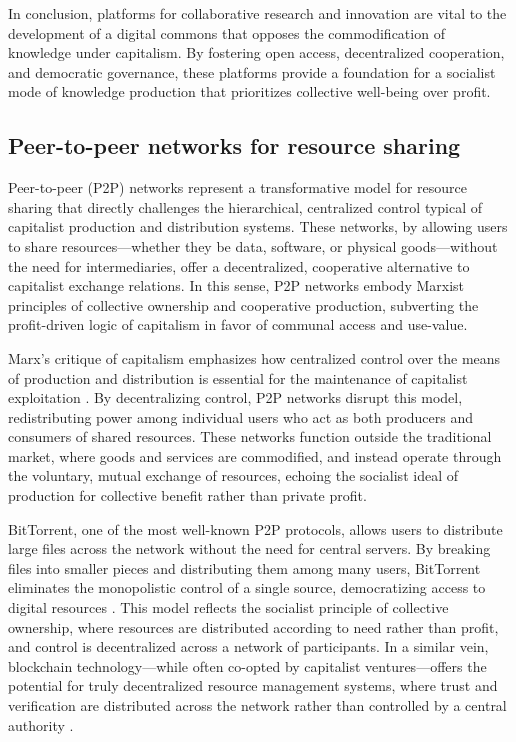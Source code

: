 \begin{refsection}
In conclusion, platforms for collaborative research and innovation are vital to the development of a digital commons that opposes the commodification of knowledge under capitalism. By fostering open access, decentralized cooperation, and democratic governance, these platforms provide a foundation for a socialist mode of knowledge production that prioritizes collective well-being over profit.

\subsection{Peer-to-peer networks for resource sharing}

Peer-to-peer (P2P) networks represent a transformative model for resource sharing that directly challenges the hierarchical, centralized control typical of capitalist production and distribution systems. These networks, by allowing users to share resources—whether they be data, software, or physical goods—without the need for intermediaries, offer a decentralized, cooperative alternative to capitalist exchange relations. In this sense, P2P networks embody Marxist principles of collective ownership and cooperative production, subverting the profit-driven logic of capitalism in favor of communal access and use-value.

Marx’s critique of capitalism emphasizes how centralized control over the means of production and distribution is essential for the maintenance of capitalist exploitation \cite[pp.~682-683]{marx2008}. By decentralizing control, P2P networks disrupt this model, redistributing power among individual users who act as both producers and consumers of shared resources. These networks function outside the traditional market, where goods and services are commodified, and instead operate through the voluntary, mutual exchange of resources, echoing the socialist ideal of production for collective benefit rather than private profit.

BitTorrent, one of the most well-known P2P protocols, allows users to distribute large files across the network without the need for central servers. By breaking files into smaller pieces and distributing them among many users, BitTorrent eliminates the monopolistic control of a single source, democratizing access to digital resources \cite[pp.~15-16]{cohen2003}. This model reflects the socialist principle of collective ownership, where resources are distributed according to need rather than profit, and control is decentralized across a network of participants. In a similar vein, blockchain technology—while often co-opted by capitalist ventures—offers the potential for truly decentralized resource management systems, where trust and verification are distributed across the network rather than controlled by a central authority \cite[pp.~88-89]{tapscott2016}.


\end{refsection}
